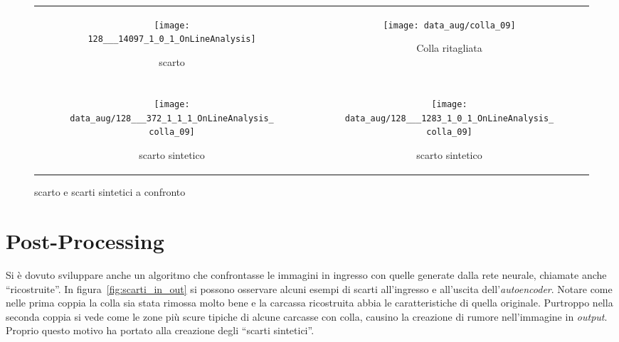 \begin{figure}[ht] %
  \begin{center}
    \begin{tabular}{cc}
      \begin{subfigure}{.4\linewidth}
        \centering\texttt{[image: 128\_\_\_14097\_1\_0\_1\_OnLineAnalysis]}
        \caption{scarto}
      \end{subfigure} &

      \begin{subfigure}{.4\linewidth}
        \centering\texttt{[image: data\_aug/colla\_09]}
        \caption{Colla ritagliata}
        \label{fig:ritaglio_colla}
      \end{subfigure} \\ \\

      \begin{subfigure}{.4\linewidth}
        \centering\texttt{[image: data\_aug/128\_\_\_372\_1\_1\_1\_OnLineAnalysis\_colla\_09]}
        \caption{scarto sintetico}
        \label{fig:scarto_sintetico_c}
      \end{subfigure} &

      \begin{subfigure}{.4\linewidth}
        \centering\texttt{[image: data\_aug/128\_\_\_1283\_1\_0\_1\_OnLineAnalysis\_colla\_09]}
        \caption{scarto sintetico}
        \label{fig:scarto_sintetico_d}
      \end{subfigure}
    \end{tabular}
    \caption{scarto e scarti sintetici a confronto}
    \label{fig:esempi_scarti_sintetici}
  \end{center}
\end{figure}

\section{Post-Processing}
Si è dovuto sviluppare anche un algoritmo che confrontasse le immagini in ingresso con quelle generate dalla rete neurale, chiamate anche ``ricostruite''.
In figura~\ref{fig:scarti_in_out} si possono osservare alcuni esempi di scarti all'ingresso e all'uscita dell'\textit{autoencoder}.
Notare come nelle prima coppia la colla sia stata rimossa molto bene e la carcassa ricostruita abbia le caratteristiche di quella originale.
Purtroppo nella seconda coppia si vede come le zone più scure tipiche di alcune carcasse con colla, causino la creazione di rumore nell'immagine in \textit{output}.
Proprio questo motivo ha portato alla creazione degli ``scarti sintetici''.

